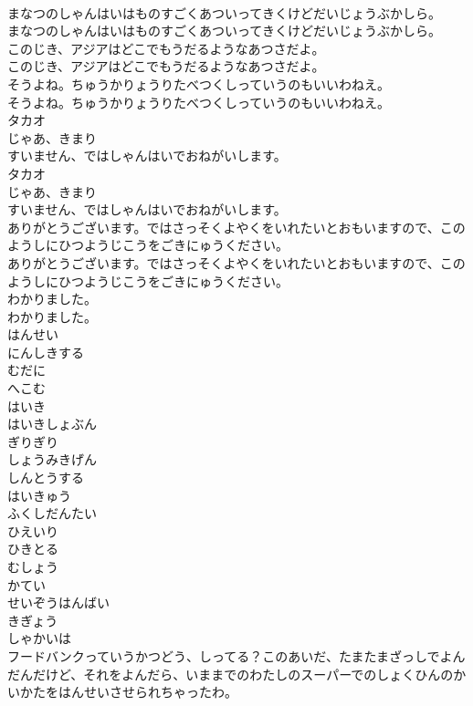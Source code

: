 \documentclass[8pt]{extreport}
\begin{document}
\begin{CJK}{UTF8}{min}
\\	まなつのしゃんはいはものすごくあついってきくけどだいじょうぶかしら。
\\	まなつのしゃんはいはものすごくあついってきくけどだいじょうぶかしら。
\\	このじき、アジアはどこでもうだるようなあつさだよ。
\\	このじき、アジアはどこでもうだるようなあつさだよ。
\\	そうよね。ちゅうかりょうりたべつくしっていうのもいいわねえ。
\\	そうよね。ちゅうかりょうりたべつくしっていうのもいいわねえ。
\\	タカオ
\\	じゃあ、きまり
\\	すいません、ではしゃんはいでおねがいします。
\\	タカオ
\\	じゃあ、きまり
\\	すいません、ではしゃんはいでおねがいします。
\\	ありがとうございます。ではさっそくよやくをいれたいとおもいますので、このようしにひつようじこうをごきにゅうください。
\\	ありがとうございます。ではさっそくよやくをいれたいとおもいますので、このようしにひつようじこうをごきにゅうください。
\\	わかりました。
\\	わかりました。
\\	はんせい
\\	にんしきする
\\	むだに
\\	へこむ
\\	はいき
\\	はいきしょぶん
\\	ぎりぎり
\\	しょうみきげん
\\	しんとうする
\\	はいきゅう
\\	ふくしだんたい
\\	ひえいり
\\	ひきとる
\\	むしょう
\\	かてい
\\	せいぞうはんばい
\\	きぎょう
\\	しゃかいは
\\	フードバンクっていうかつどう、しってる？このあいだ、たまたまざっしでよんだんだけど、それをよんだら、いままでのわたしのスーパーでのしょくひんのかいかたをはんせいさせられちゃったわ。

\end{CJK}
\end{document}

